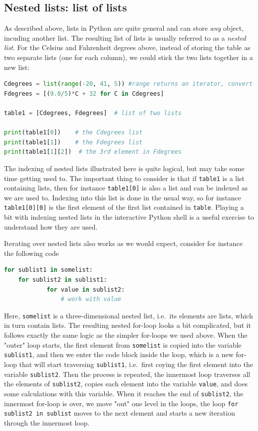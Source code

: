 \documentclass[graybox,envcountchap,sectrefs,final]{svmonodo}
\begin{document}
\subsection{Nested lists: list of lists}
As described above, lists in Python are quite general and can store \emph{any} object, incuding another list. The resulting list of lists
is usually referred to as a \emph{nested list}. For the Celsius and Fahrenheit degrees above, instead of storing the table as
two separate lists (one for each column), we could stick the two lists together in a new list:
\begin{lstlisting}[language=Python,style=blue1]
Cdegrees = list(range(-20, 41, 5)) #range returns an iterator, convert to a list
Fdegrees = [(9.0/5)*C + 32 for C in Cdegrees]

table1 = [Cdegrees, Fdegrees]  # list of two lists

print(table1[0])    # the Cdegrees list
print(table1[1])    # the Fdegrees list
print(table1[1][2])  # the 3rd element in Fdegrees
\end{lstlisting}
The indexing of nested lists illustrated here is quite logical, but may take some time getting used to. The important thing to consider
is that if \texttt{table1} is a list containing lists, then for instance \texttt{table1[0]} is also a list and can be indexed as we are used to.
Indexing into
this list is done in the usual way, so for instance \texttt{table1[0][0]} is the first element of the first list contained in \texttt{table}.
Playing a bit with indexing nested lists in the interactive Python shell is a useful exercise to understand how they are used.

Iterating over nested lists also works as we would expect, consider for instance the following code
\begin{lstlisting}[language=Python,style=blue1]
for sublist1 in somelist:
    for sublist2 in sublist1:
            for value in sublist2:
                # work with value
\end{lstlisting}
Here, \texttt{somelist} is a three-dimensional nested list, i.e.~its elements are lists, which in turn contain lists. The resulting
nested for-loop looks a bit complicated, but it follows exactly the same logic as the simpler for-loops we used above.
When the "outer" loop starts, the first element from \texttt{somelist} is copied into the variable \texttt{sublist1}, and then we enter the code block
inside the loop, which is a new for-loop that will start traversing \texttt{sublist1}, i.e.~first coying the first element into the variable
\texttt{sublist2}. Then the process is repeated, the innermost loop traverses all the elements of  \texttt{sublist2}, copies each element into the
variable \texttt{value}, and does some calculations with this variable. When it reaches the end of \texttt{sublist2}, the innermost for-loop is over, we
move "out" one level in the loops, the loop \texttt{for sublist2 in sublist} moves to the next element and starts a new iteration
through the innermost loop.
\end{document}
